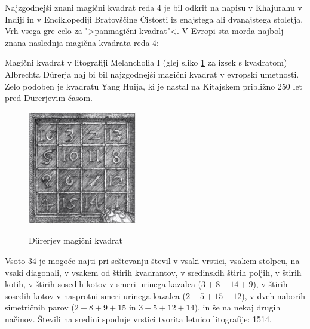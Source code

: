 \documentclass[a4paper,12pt]{article}
\begin{document}
Najzgodnejši znani magični kvadrat reda 4 je bil odkrit na napisu
v Khajurahu v Indiji in v Enciklopediji Bratovščine Čistosti iz enajstega
ali dvanajstega stoletja. Vrh vsega gre celo za ">panmagični kvadrat"<.
V Evropi sta morda najbolj znana naslednja magična kvadrata reda 4:

Magični kvadrat v litografiji Melancholia I (glej sliko \ref{fig:durer}
za izsek s kvadratom) Albrechta Dürerja naj bi bil najzgodnejši magični kvadrat
v evropski umetnosti. Zelo podoben je kvadratu Yang Huija, ki je nastal na Kitajskem
približno 250 let pred Dürerjevim časom. %

\begin{figure}[!ht]
   \centering
   \caption{Dürerjev magični kvadrat}
   \includegraphics[scale=1.5]{durer.png}
   \label{fig:durer}
\end{figure}

Vsoto 34 je mogoče najti pri seštevanju števil v vsaki vrstici, vsakem stolpcu,
na vsaki diagonali, v vsakem od štirih kvadrantov, v sredinskih štirih poljih,
v štirih kotih, v štirih sosedih kotov v smeri urinega kazalca ($3+8+14+9$), v
štirih sosedih kotov v nasprotni smeri urinega kazalca ($2+5+15+12$), v dveh naborih
simetričnih parov ($2+8+9+15$ in $3+5+12+14$), in še na nekaj drugih načinov.
Števili na sredini spodnje vrstici tvorita letnico litografije: 1514.
%
\end{document}

